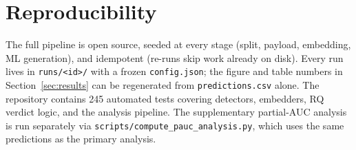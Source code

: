 \documentclass[10pt,twocolumn,a4paper]{article}
\begin{document}
\section{Reproducibility}
\label{app:reproducibility}
The full pipeline is open source, seeded at every stage (split, payload, embedding, ML generation), and idempotent (re-runs skip work already on disk). Every run lives in \texttt{runs/<id>/} with a frozen \texttt{config.json}; the figure and table numbers in Section~\ref{sec:results} can be regenerated from \texttt{predictions.csv} alone. The repository contains 245 automated tests covering detectors, embedders, RQ verdict logic, and the analysis pipeline. The supplementary partial-AUC analysis is run separately via \texttt{scripts/compute\_pauc\_analysis.py}, which uses the same predictions as the primary analysis.
\end{document}
